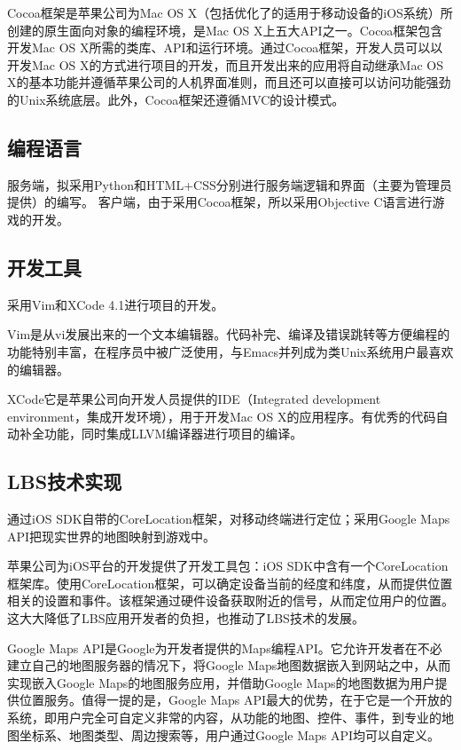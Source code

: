 \documentclass{article}
\begin{document}
\begin{CJK}{UTF8}{gbsn}
  Cocoa框架是苹果公司为Mac OS X（包括优化了的适用于移动设备的iOS系统）所创建的原生面向对象的编程环境，是Mac OS X上五大API之一。Cocoa框架包含开发Mac OS X所需的类库、API和运行环境。通过Cocoa框架，开发人员可以以开发Mac OS X的方式进行项目的开发，而且开发出来的应用将自动继承Mac OS X的基本功能并遵循苹果公司的人机界面准则，而且还可以直接可以访问功能强劲的Unix系统底层\cite{MAN_Cocoa}。此外，Cocoa框架还遵循MVC的设计模式。

  \subsection{编程语言}

  服务端，拟采用Python和HTML+CSS分别进行服务端逻辑和界面（主要为管理员提供）的编写。
  客户端，由于采用Cocoa框架，所以采用Objective C语言进行游戏的开发。

  \subsection{开发工具}

  采用Vim和XCode 4.1进行项目的开发。

  Vim是从vi发展出来的一个文本编辑器。代码补完、编译及错误跳转等方便编程的功能特别丰富，在程序员中被广泛使用，与Emacs并列成为类Unix系统用户最喜欢的编辑器。

  XCode它是苹果公司向开发人员提供的IDE（Integrated development environment，集成开发环境），用于开发Mac OS X的应用程序。有优秀的代码自动补全功能，同时集成LLVM编译器进行项目的编译。

  \subsection{LBS技术实现}

  通过iOS SDK自带的CoreLocation框架，对移动终端进行定位；采用Google Maps API把现实世界的地图映射到游戏中。

  苹果公司为iOS平台的开发提供了开发工具包：iOS SDK中含有一个CoreLocation框架库。使用CoreLocation框架，可以确定设备当前的经度和纬度，从而提供位置相关的设置和事件。该框架通过硬件设备获取附近的信号，从而定位用户的位置\cite{iOSLIB}。这大大降低了LBS应用开发者的负担，也推动了LBS技术的发展。

  Google Maps API是Google为开发者提供的Maps编程API。它允许开发者在不必建立自己的地图服务器的情况下，将Google Maps地图数据嵌入到网站之中，从而实现嵌入Google Maps的地图服务应用，并借助Google Maps的地图数据为用户提供位置服务。值得一提的是，Google Maps API最大的优势，在于它是一个开放的系统，即用户完全可自定义非常的内容，从功能的地图、控件、事件，到专业的地图坐标系、地图类型、周边搜索等，用户通过Google Maps API均可以自定义。


\end{CJK}
\end{document}

